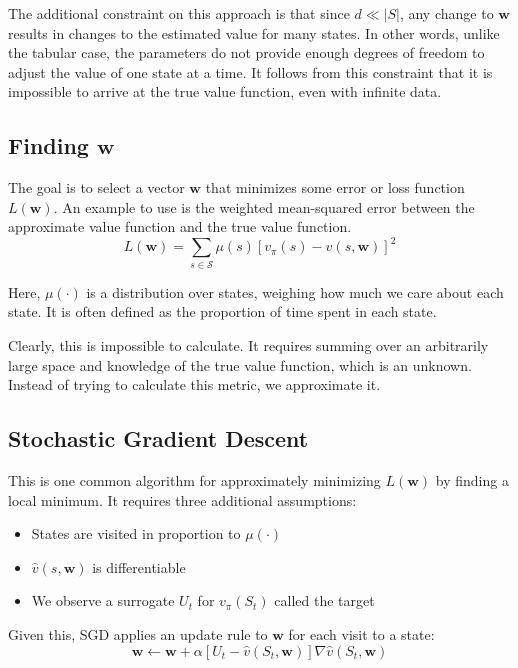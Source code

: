 \documentclass{article}
\begin{document}
The additional constraint on this approach is that since $d \ll |S|$, any change to $\bm{w}$ results in changes to the estimated value for 
many states. In other words, unlike the tabular case, the parameters do not provide enough degrees of freedom to adjust the value of one state
at a time. It follows from this constraint that it is impossible to arrive at the true value function, even with infinite data.

\subsection{Finding $\bm{w}$}
The goal is to select a vector $\bm{w}$ that minimizes some error or loss function $L(\bm{w})$. An example to use is the weighted mean-squared error between the approximate value
function and the true value function.
\begin{equation}
  L(\bm{w}) = \sum_{s \in \mathcal{S}} \mu(s) [v_\pi(s) - \hat{v}(s, \bm{w})]^2
\end{equation}

Here, $\mu(\cdot)$ is a distribution over states, weighing how much we care about each state. It is often defined as the proportion of time spent in each state.

Clearly, this is impossible to calculate. It requires summing over an arbitrarily large space and knowledge of the true value function, which is
an unknown. Instead of trying to calculate this metric, we approximate it.

\subsection{Stochastic Gradient Descent}
This is one common algorithm for approximately minimizing $L(\bm{w})$ by finding a local minimum. It requires three additional assumptions:
\begin{itemize}
  \item States are visited in proportion to $\mu(\cdot)$
  \item $\hat{v}(s, \bm{w})$ is differentiable
  \item We observe a surrogate $U_t$ for $v_\pi(S_t)$ called the target
\end{itemize}

Given this, SGD applies an update rule to $\bm{w}$ for each visit to a state:
\begin{equation}
  \bm{w} \leftarrow \bm{w} + \alpha [U_t - \hat{v}(S_t, \bm{w})] \nabla \hat{v}(S_t, \bm{w})
\end{equation}
\end{document}
